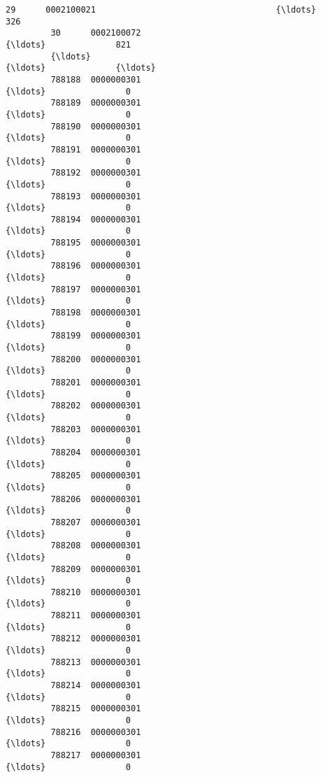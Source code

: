 \documentclass[11pt]{article}
\begin{document}
\begin{Verbatim}[commandchars=\\\{\}]
         29      0002100021                                    {\ldots}              326   
         30      0002100072                                    {\ldots}              821   
         {\ldots}                                                   {\ldots}              {\ldots}   
         788188  0000000301                                    {\ldots}                0   
         788189  0000000301                                    {\ldots}                0   
         788190  0000000301                                    {\ldots}                0   
         788191  0000000301                                    {\ldots}                0   
         788192  0000000301                                    {\ldots}                0   
         788193  0000000301                                    {\ldots}                0   
         788194  0000000301                                    {\ldots}                0   
         788195  0000000301                                    {\ldots}                0   
         788196  0000000301                                    {\ldots}                0   
         788197  0000000301                                    {\ldots}                0   
         788198  0000000301                                    {\ldots}                0   
         788199  0000000301                                    {\ldots}                0   
         788200  0000000301                                    {\ldots}                0   
         788201  0000000301                                    {\ldots}                0   
         788202  0000000301                                    {\ldots}                0   
         788203  0000000301                                    {\ldots}                0   
         788204  0000000301                                    {\ldots}                0   
         788205  0000000301                                    {\ldots}                0   
         788206  0000000301                                    {\ldots}                0   
         788207  0000000301                                    {\ldots}                0   
         788208  0000000301                                    {\ldots}                0   
         788209  0000000301                                    {\ldots}                0   
         788210  0000000301                                    {\ldots}                0   
         788211  0000000301                                    {\ldots}                0   
         788212  0000000301                                    {\ldots}                0   
         788213  0000000301                                    {\ldots}                0   
         788214  0000000301                                    {\ldots}                0   
         788215  0000000301                                    {\ldots}                0   
         788216  0000000301                                    {\ldots}                0   
         788217  0000000301                                    {\ldots}                0   
         

\end{Verbatim}
\end{document}

